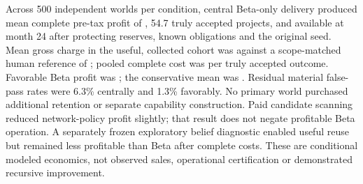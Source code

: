 Across 500 independent worlds per condition, central Beta-only delivery produced mean complete pre-tax profit of , 54.7 truly accepted projects, and  available at month 24 after protecting reserves, known obligations and the original seed. Mean gross charge in the useful, collected cohort was  against a scope-matched human reference of ; pooled complete cost was  per truly accepted outcome. Favorable Beta profit was ; the conservative mean was . Residual material false-pass rates were 6.3\% centrally and 1.3\% favorably. No primary world purchased additional retention or separate capability construction. Paid candidate scanning reduced network-policy profit slightly; that result does not negate profitable Beta operation. A separately frozen exploratory belief diagnostic enabled useful reuse but remained less profitable than Beta after complete costs. These are conditional modeled economics, not observed sales, operational certification or demonstrated recursive improvement.
